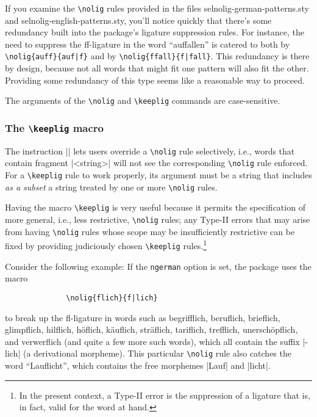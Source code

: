 \documentclass[11pt]{article}
\newcommand{\pkg}[1]{\textsf{#1}}
\newcommand{\opt}[1]{\texttt{#1}}
\newcommand{\cmmd}[1]{\texttt{\textbackslash #1}}
\begin{document}
If you examine the \cmmd{nolig} rules provided in the files \pkg{selnolig-german-patterns.sty} and \pkg{selnolig-english-patterns.sty}, you'll notice quickly that there's some redundancy built into the package's ligature suppression rules. For instance, the need to suppress the ff-ligature in the word \enquote{auffallen} is catered to both by \Verb+\nolig{auff}{auf|f}+ and by \Verb+\nolig{ffall}{f|fall}+. This redundancy is there by design, because not all words that might fit one pattern will also fit the other. Providing some redundancy of this type seems like a reasonable way to proceed.

The arguments of the \cmmd{nolig} and \cmmd{keeplig} commands are case-sensitive. 

\subsubsection{The \cmmd{keeplig} macro} 
\label{sec:keeplig}


The instruction || lets users override a \cmmd{nolig} rule selectively, i.e., words that contain fragment |<string>| will not see the corresponding \cmmd{nolig} rule enforced. For a \cmmd{keeplig} rule to work properly, its argument must be a string that includes \emph{as a subset} a string treated by one or more \cmmd{nolig} rules.

Having the macro \cmmd{keeplig} is very useful because it permits the specification of more general, i.e., less restrictive, \cmmd{nolig} rules; any Type-II errors that may arise from having \cmmd{nolig} rules whose scope may be insufficiently restrictive can be fixed by providing judiciously chosen \cmmd{keeplig} rules.\footnote{In the present context, a Type-II error is the suppression of a ligature that is, in fact, valid for the word at hand.}

Consider the following example: If the \opt{ngerman} option is set, the package uses the macro 
\begin{Verbatim}
              \nolig{flich}{f|lich}
\end{Verbatim}
to break up the fl-ligature in words such as begrifflich, beruflich, brieflich, glimpflich, hilflich, höflich, käuflich, sträflich, tariflich, trefflich, unerschöpflich, and verwerflich (and quite a few more such words), which all contain the suffix |-lich| (a derivational morpheme). This particular \cmmd{nolig} rule also catches the word \enquote{Lauflicht}, which contains the free morphemes |Lauf| and |licht|. 
\end{document}
